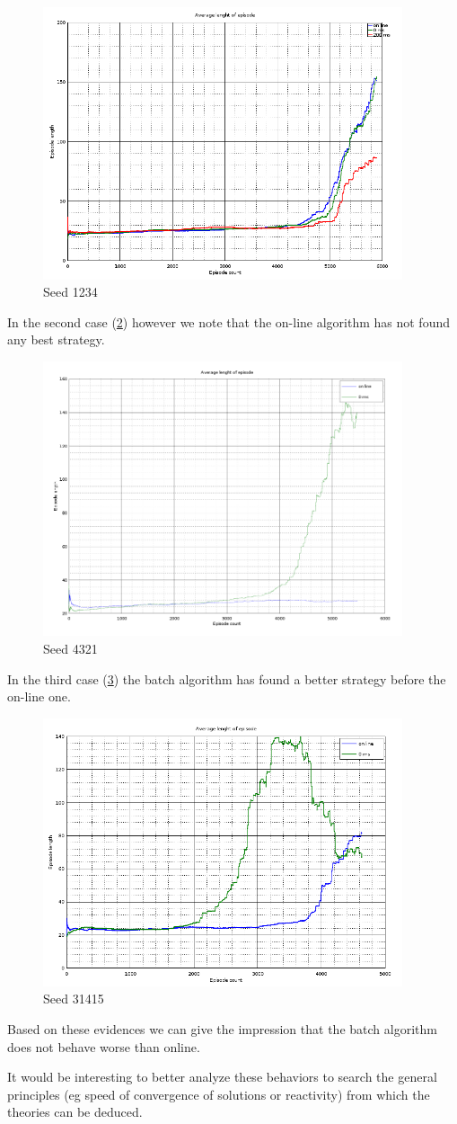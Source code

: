 \documentclass[a4paper,11pt]{article}
\begin{document}
\begin{figure}
	\label{fig:seed1234}
	\includegraphics[width=300pt]{episodes-123}
	\caption{Seed 1234}
\end{figure}

In the second case (\ref{fig:seed4321}) however we note that the on-line algorithm has not found any best strategy.

\begin{figure}
	\label{fig:seed4321}
	\includegraphics[width=300pt]{episodes-321}
	\caption{Seed 4321}
\end{figure}

In the third case (\ref{fig:seed31415}) the batch algorithm has found a better strategy before the on-line one.

\begin{figure}
	\label{fig:seed31415}
	\includegraphics[width=300pt]{episodes-314}
	\caption{Seed 31415}
\end{figure}

Based on these evidences we can give the impression that the batch algorithm does not behave worse than online.

It would be interesting to better analyze these behaviors to search the general principles (eg speed of convergence of solutions or reactivity) from which the theories can be deduced.
\end{document}
